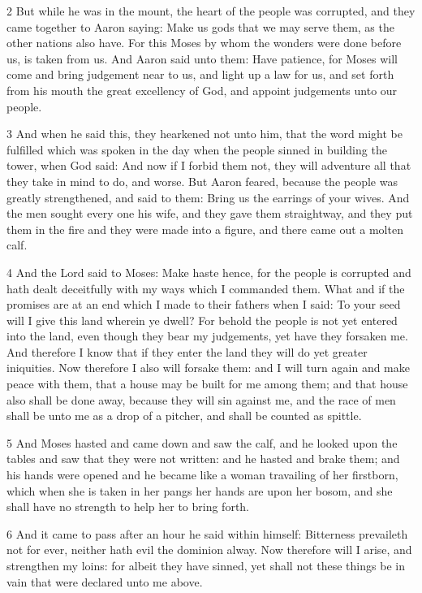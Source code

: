 \par 2 But while he was in the mount, the heart of the people was corrupted, and they came together to Aaron saying: Make us gods that we may serve them, as the other nations also have. For this Moses by whom the wonders were done before us, is taken from us. And Aaron said unto them: Have patience, for Moses will come and bring judgement near to us, and light up a law for us, and set forth from his mouth the great excellency of God, and appoint judgements unto our people. 

\par 3 And when he said this, they hearkened not unto him, that the word might be fulfilled which was spoken in the day when the people sinned in building the tower, when God said: And now if I forbid them not, they will adventure all that they take in mind to do, and worse. But Aaron feared, because the people was greatly strengthened, and said to them: Bring us the earrings of your wives. And the men sought every one his wife, and they gave them straightway, and they put them in the fire and they were made into a figure, and there came out a molten calf.

\par 4 And the Lord said to Moses: Make haste hence, for the people is corrupted and hath dealt deceitfully with my ways which I commanded them. What and if the promises are at an end which I made to their fathers when I said: To your seed will I give this land wherein ye dwell? For behold the people is not yet entered into the land, even though they bear my judgements, yet have they forsaken me. And therefore I know that if they enter the land they will do yet greater iniquities. Now therefore I also will forsake them: and I will turn again and make peace with them, that a house may be built for me among them; and that house also shall be done away, because they will sin against me, and the race of men shall be unto me as a drop of a pitcher, and shall be counted as spittle. 

\par 5 And Moses hasted and came down and saw the calf, and he looked upon the tables and saw that they were not written: and he hasted and brake them; and his hands were opened and he became like a woman travailing of her firstborn, which when she is taken in her pangs her hands are upon her bosom, and she shall have no strength to help her to bring forth. 

\par 6 And it came to pass after an hour he said within himself: Bitterness prevaileth not for ever, neither hath evil the dominion alway. Now therefore will I arise, and strengthen my loins: for albeit they have sinned, yet shall not these things be in vain that were declared unto me above. 

